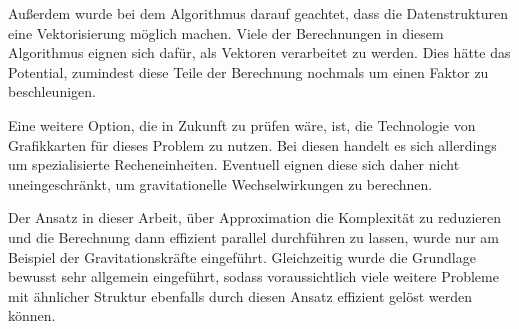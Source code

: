     Außerdem wurde bei dem Algorithmus darauf geachtet, dass die Datenstrukturen eine Vektorisierung möglich machen. Viele der Berechnungen in diesem Algorithmus eignen sich dafür, als Vektoren
    verarbeitet zu werden. Dies hätte das Potential, zumindest diese Teile der Berechnung nochmals um einen Faktor zu beschleunigen. 
    
    Eine weitere Option, die in Zukunft zu prüfen wäre, ist, die Technologie von Grafikkarten für dieses Problem zu nutzen. Bei diesen handelt es sich allerdings um spezialisierte Recheneinheiten. 
    Eventuell eignen diese sich daher nicht uneingeschränkt, um gravitationelle Wechselwirkungen zu berechnen.
    
    Der Ansatz in dieser Arbeit, über Approximation die Komplexität zu reduzieren und die Berechnung dann effizient parallel durchführen zu lassen, wurde nur am Beispiel der Gravitationskräfte
    eingeführt. Gleichzeitig wurde die Grundlage bewusst sehr allgemein eingeführt, sodass voraussichtlich viele weitere Probleme mit ähnlicher Struktur ebenfalls durch diesen Ansatz effizient
    gelöst werden können.
